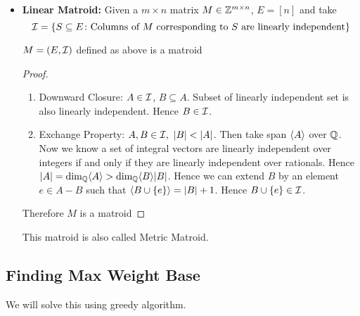 \begin{itemize}[label=$\bullet$]
\item \textbf{Linear Matroid:} Given a $m\times n$ matrix $M\in \mathbb{Z}^{m\times n}$, $E=[n]$ and take $$\mathcal{I}=\{S\subseteq E\colon \text{Columns of $M$ corresponding to $S$ are linearly independent} \}$$
\begin{lemma}{}{}
	$M=(E,\mathcal{I})$ defined as above is a matroid
\end{lemma}
\begin{proof}
	\begin{enumerate}[label=\bfseries\tiny\protect\circled{\small\arabic*}]
		\item Downward Closure: $A\in \mathcal{I}$, $B\subseteq A$. Subset of linearly independent set is also linearly independent. Hence $B\in \mathcal{I}$. 
		\item Exchange Property: $A,B\in\mcI,\ |B|<|A|$. Then take span $\langle A\rangle$ over $\mathbb{Q}$. Now we know a set of integral vectors are linearly independent over integers if and only if they are linearly independent over rationals. Hence $|A|=\dim _{\mathbb{Q}}\langle A\rangle> \dim _{\mathbb{Q}}\langle B\rangle|B|$. Hence we can extend $B$ by an element $e\in A-B$ such that $\langle B\cup \{e\}\rangle =|B|+1$. Hence $B\cup \{e\}\in \mathcal{I}$.
	\end{enumerate}Therefore $M$ is a matroid
\end{proof}
This matroid is also called Metric Matroid.
\end{itemize}
\subsection{Finding Max Weight Base}
\begin{algoprob}
\end{algoprob}

We will solve this using greedy algorithm.

